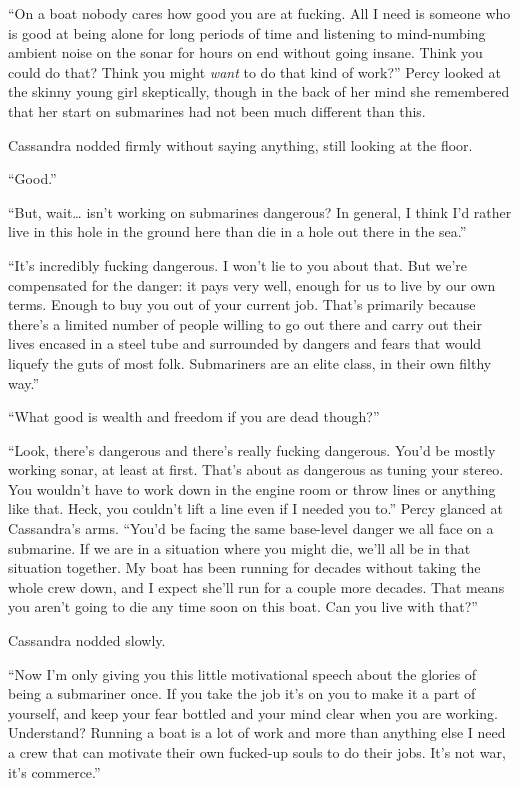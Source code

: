 \documentclass[
]{scrbook}
\begin{document}
``On a boat nobody cares how good you are at fucking. All I need is
someone who is good at being alone for long periods of time and
listening to mind-numbing ambient noise on the sonar for hours on end
without going insane. Think you could do that? Think you might
\emph{want} to do that kind of work?'' Percy looked at the skinny young
girl skeptically, though in the back of her mind she remembered that her
start on submarines had not been much different than this.

Cassandra nodded firmly without saying anything, still looking at the
floor.

``Good.''

``But, wait\ldots{} isn't working on submarines dangerous? In general, I
think I'd rather live in this hole in the ground here than die in a hole
out there in the sea.''

``It's incredibly fucking dangerous. I won't lie to you about that. But
we're compensated for the danger: it pays very well, enough for us to
live by our own terms. Enough to buy you out of your current job. That's
primarily because there's a limited number of people willing to go out
there and carry out their lives encased in a steel tube and surrounded
by dangers and fears that would liquefy the guts of most folk.
Submariners are an elite class, in their own filthy way.''

``What good is wealth and freedom if you are dead though?''

``Look, there's dangerous and there's really fucking dangerous. You'd be
mostly working sonar, at least at first. That's about as dangerous as
tuning your stereo. You wouldn't have to work down in the engine room or
throw lines or anything like that. Heck, you couldn't lift a line even
if I needed you to.'' Percy glanced at Cassandra's arms. ``You'd be
facing the same base-level danger we all face on a submarine. If we are
in a situation where you might die, we'll all be in that situation
together. My boat has been running for decades without taking the whole
crew down, and I expect she'll run for a couple more decades. That means
you aren't going to die any time soon on this boat. Can you live with
that?''

Cassandra nodded slowly.

``Now I'm only giving you this little motivational speech about the
glories of being a submariner once. If you take the job it's on you to
make it a part of yourself, and keep your fear bottled and your mind
clear when you are working. Understand? Running a boat is a lot of work
and more than anything else I need a crew that can motivate their own
fucked-up souls to do their jobs. It's not war, it's commerce.''
\end{document}
